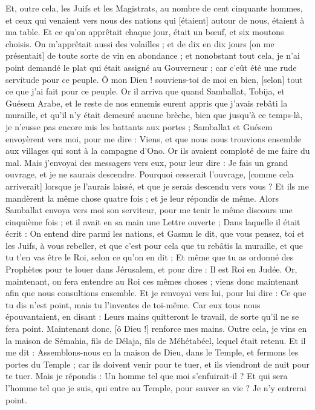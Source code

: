 \begin{multicols}{2}
Et, outre cela, les Juifs et les Magistrats, au nombre de cent cinquante hommes, et ceux qui venaient vers nous des nations qui [étaient] autour de nous, étaient à ma table.
Et ce qu'on apprêtait chaque jour, était un bœuf, et six moutons choisis. On m'apprêtait aussi des volailles ; et de dix en dix jours [on me présentait] de toute sorte de vin en abondance ; et nonobstant tout cela, je n'ai point demandé le plat qui était assigné au Gouverneur ; car c'eût été une rude servitude pour ce peuple.
Ô mon Dieu ! souviens-toi de moi en bien, [selon] tout ce que j'ai fait pour ce peuple.
\VerseOne{}Or il arriva que quand Samballat, Tobija, et Guésem Arabe, et le reste de nos ennemis eurent appris que j'avais rebâti la muraille, et qu'il n'y était demeuré aucune brèche, bien que jusqu'à ce temps-là, je n'eusse pas encore mis les battants aux portes ;
Samballat et Guésem envoyèrent vers moi, pour me dire : Viens, et que nous nous trouvions ensemble aux villages qui sont à la campagne d'Ono. Or ils avaient comploté de me faire du mal.
Mais j'envoyai des messagers vers eux, pour leur dire : Je fais un grand ouvrage, et je ne saurais descendre. Pourquoi cesserait l'ouvrage, [comme cela arriverait] lorsque je l'aurais laissé, et que je serais descendu vers vous ?
Et ils me mandèrent la même chose quatre fois ; et je leur répondis de même.
Alors Samballat envoya vers moi son serviteur, pour me tenir le même discours une cinquième fois ; et il avait en sa main une Lettre ouverte ;
Dans laquelle il était écrit : On entend dire parmi les nations, et Gasmu le dit, que vous pensez, toi et les Juifs, à vous rebeller, et que c'est pour cela que tu rebâtis la muraille, et que tu t'en vas être le Roi, selon ce qu'on en dit ;
Et même que tu as ordonné des Prophètes pour te louer dans Jérusalem, et pour dire : Il est Roi en Judée. Or, maintenant, on fera entendre au Roi ces mêmes choses ; viens donc maintenant afin que nous consultions ensemble.
Et je renvoyai vers lui, pour lui dire : Ce que tu dis n'est point, mais tu l'inventes de toi-même.
Car eux tous nous épouvantaient, en disant : Leurs mains quitteront le travail, de sorte qu'il ne se fera point. Maintenant donc, [ô Dieu !] renforce mes mains.
Outre cela, je vins en la maison de Sémahia, fils de Délaja, fils de Méhétabéel, lequel était retenu. Et il me dit : Assemblons-nous en la maison de Dieu, dans le Temple, et fermons les portes du Temple ; car ils doivent venir pour te tuer, et ils viendront de nuit pour te tuer.
Mais je répondis : Un homme tel que moi s'enfuirait-il ? Et qui sera l'homme tel que je suis, qui entre au Temple, pour sauver sa vie ? Je n'y entrerai point.

\end{multicols}
